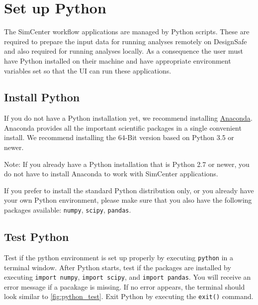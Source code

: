 \section{Set up Python}

The SimCenter workflow applications are managed by Python scripts. These are required to prepare the input data for running analyses remotely on DesignSafe and also required for running analyses locally. As a consequence the user must have Python installed on their machine and have appropriate environment variables set so that the UI can run these applications.

\subsection{Install Python}

If you do not have a Python installation yet, we recommend installing \href{http://www.anaconda.com/distribution/#download-section}{Anaconda}. Anaconda provides all the important scientific packages in a single convenient install. We recommend installing the 64-Bit version based on Python 3.5 or newer.

Note: If you already have a Python installation that is Python 2.7 or newer, you do not have to install Anaconda to work with SimCenter applications. 

If you prefer to install the standard Python distribution only, or you already have your own Python environment, please make sure that you also have the following packages available: \texttt{numpy}, \texttt{scipy}, \texttt{pandas}.

\subsection{Test Python}

Test if the python environment is set up properly by executing \texttt{python} in a terminal window. After Python starts, test if the packages are installed by executing \texttt{import numpy}, \texttt{import scipy}, and \texttt{import pandas}. You will receive an error message if a pacakage is missing. If no error appears, the terminal should look similar to \autoref{fig:python_test}. Exit Python by executing the \texttt{exit()} command.

